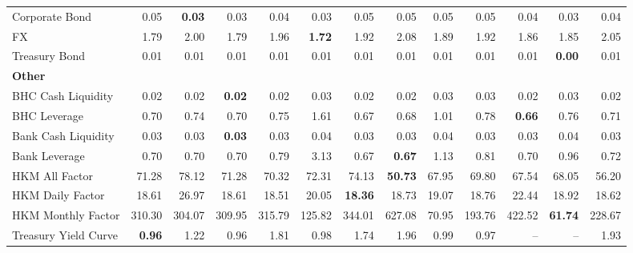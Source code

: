 \begin{table}[htbp]
\begin{tabular}{@{}lrrrrrrrrrrrr@{}}
Corporate Bond & 0.05 & \textbf{0.03} & 0.03 & 0.04 & 0.03 & 0.05 & 0.05 & 0.05 & 0.05 & 0.04 & 0.03 & 0.04 \\
FX & 1.79 & 2.00 & 1.79 & 1.96 & \textbf{1.72} & 1.92 & 2.08 & 1.89 & 1.92 & 1.86 & 1.85 & 2.05 \\
Treasury Bond & 0.01 & 0.01 & 0.01 & 0.01 & 0.01 & 0.01 & 0.01 & 0.01 & 0.01 & 0.01 & \textbf{0.00} & 0.01 \\
\midrule
\multicolumn{13}{l}{\textbf{Other}} \\
BHC Cash Liquidity & 0.02 & 0.02 & \textbf{0.02} & 0.02 & 0.03 & 0.02 & 0.02 & 0.03 & 0.03 & 0.02 & 0.03 & 0.02 \\
BHC Leverage & 0.70 & 0.74 & 0.70 & 0.75 & 1.61 & 0.67 & 0.68 & 1.01 & 0.78 & \textbf{0.66} & 0.76 & 0.71 \\
Bank Cash Liquidity & 0.03 & 0.03 & \textbf{0.03} & 0.03 & 0.04 & 0.03 & 0.03 & 0.04 & 0.03 & 0.03 & 0.04 & 0.03 \\
Bank Leverage & 0.70 & 0.70 & 0.70 & 0.79 & 3.13 & 0.67 & \textbf{0.67} & 1.13 & 0.81 & 0.70 & 0.96 & 0.72 \\
HKM All Factor & 71.28 & 78.12 & 71.28 & 70.32 & 72.31 & 74.13 & \textbf{50.73} & 67.95 & 69.80 & 67.54 & 68.05 & 56.20 \\
HKM Daily Factor & 18.61 & 26.97 & 18.61 & 18.51 & 20.05 & \textbf{18.36} & 18.73 & 19.07 & 18.76 & 22.44 & 18.92 & 18.62 \\
HKM Monthly Factor & 310.30 & 304.07 & 309.95 & 315.79 & 125.82 & 344.01 & 627.08 & 70.95 & 193.76 & 422.52 & \textbf{61.74} & 228.67 \\
Treasury Yield Curve & \textbf{0.96} & 1.22 & 0.96 & 1.81 & 0.98 & 1.74 & 1.96 & 0.99 & 0.97 & -- & -- & 1.93 \\
\bottomrule
\end{tabular}
\vspace{0.1cm}

\end{table}
